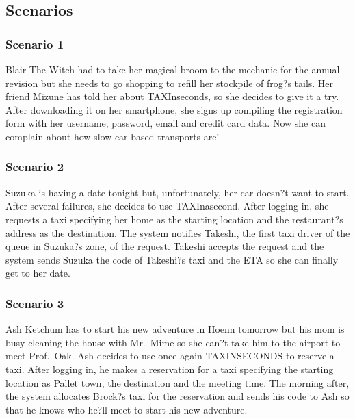 \documentclass{article}
\begin{document}
\subsection{Scenarios}
\subsubsection{Scenario 1}
Blair The Witch had to take her magical broom to the mechanic for the annual revision but she needs to go shopping to refill her stockpile of frog?s tails. Her friend Mizune has told her about TAXInseconds, so she decides to give it a try. After downloading it on her smartphone, she signs up compiling the registration form with her username, password, email and credit card data. Now she can complain about how slow car-based transports are!
\subsubsection{Scenario 2}
Suzuka is having a date tonight but, unfortunately, her car doesn?t want to start. After several failures, she decides to use TAXInasecond. After logging in, she requests a taxi specifying her home as the starting location and the restaurant?s address as the destination. The system notifies Takeshi, the first taxi driver of the queue in Suzuka?s zone, of the request. Takeshi accepts the request and the system sends Suzuka the code of Takeshi?s taxi and the ETA so she can finally get to her date.
\subsubsection{Scenario 3}
Ash Ketchum has to start his new adventure in Hoenn tomorrow but his mom is busy cleaning the house with Mr.\ Mime so she can?t take him to the airport to meet Prof.\ Oak. Ash decides to use once again TAXINSECONDS to reserve a taxi. After logging in, he makes a reservation for a taxi specifying the starting location as Pallet town, the destination and the meeting time. The morning after, the system allocates Brock?s taxi for the reservation and sends his code to Ash so that he knows who he?ll meet to start his new adventure. 
\end{document}

